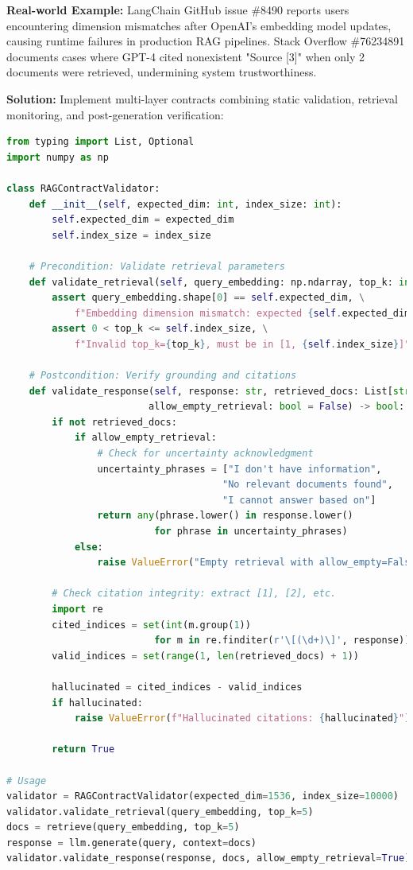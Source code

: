 \documentclass[11pt]{article}
\begin{document}
\textbf{Real-world Example:} LangChain GitHub issue \#8490 reports users encountering dimension mismatches after OpenAI's embedding model updates, causing runtime failures in production RAG pipelines. Stack Overflow \#76234891 documents cases where GPT-4 cited nonexistent "Source [3]" when only 2 documents were retrieved, undermining system trustworthiness.

\textbf{Solution:} Implement multi-layer contracts combining static validation, retrieval monitoring, and post-generation verification:

\begin{lstlisting}[language=Python]
from typing import List, Optional
import numpy as np

class RAGContractValidator:
    def __init__(self, expected_dim: int, index_size: int):
        self.expected_dim = expected_dim
        self.index_size = index_size

    # Precondition: Validate retrieval parameters
    def validate_retrieval(self, query_embedding: np.ndarray, top_k: int):
        assert query_embedding.shape[0] == self.expected_dim, \
            f"Embedding dimension mismatch: expected {self.expected_dim}, got {query_embedding.shape[0]}"
        assert 0 < top_k <= self.index_size, \
            f"Invalid top_k={top_k}, must be in [1, {self.index_size}]"

    # Postcondition: Verify grounding and citations
    def validate_response(self, response: str, retrieved_docs: List[str],
                         allow_empty_retrieval: bool = False) -> bool:
        if not retrieved_docs:
            if allow_empty_retrieval:
                # Check for uncertainty acknowledgment
                uncertainty_phrases = ["I don't have information",
                                      "No relevant documents found",
                                      "I cannot answer based on"]
                return any(phrase.lower() in response.lower()
                          for phrase in uncertainty_phrases)
            else:
                raise ValueError("Empty retrieval with allow_empty=False")

        # Check citation integrity: extract [1], [2], etc.
        import re
        cited_indices = set(int(m.group(1))
                          for m in re.finditer(r'\[(\d+)\]', response))
        valid_indices = set(range(1, len(retrieved_docs) + 1))

        hallucinated = cited_indices - valid_indices
        if hallucinated:
            raise ValueError(f"Hallucinated citations: {hallucinated}")

        return True

# Usage
validator = RAGContractValidator(expected_dim=1536, index_size=10000)
validator.validate_retrieval(query_embedding, top_k=5)
docs = retrieve(query_embedding, top_k=5)
response = llm.generate(query, context=docs)
validator.validate_response(response, docs, allow_empty_retrieval=True)
\end{lstlisting}
\end{document}
